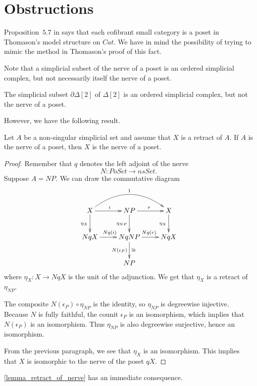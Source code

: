 
\section{Obstructions}
\label{sec:possible}

Proposition~$5.7$ in \cite{Th80} says that each cofibrant small category is a poset in Thomason's model structure on $Cat$. We have in mind the possibility of trying to mimic the method in Thomason's proof of this fact.

Note that a simplicial subset of the nerve of a poset is an ordered simplicial complex, but not necessarily itself the nerve of a poset.
\begin{example}\label{ex:supplement_lemma_retract_of_nerve}
The simplicial subset $\partial \Delta [2]$ of $\Delta [2]$ is an ordered simplicial complex, but not the nerve of a poset.
\end{example}
\noindent However, we have the following result.
\begin{lemma}\label{lemma_retract_of_nerve}
Let $A$ be a non-singular simplicial set and assume that $X$ is a retract of $A$. If $A$ is the nerve of a poset, then $X$ is the nerve of a poset.
\end{lemma}
\begin{proof}
Remember that $q$ denotes the left adjoint of the nerve
\[N:PoSet\to nsSet.\]
Suppose $A=NP$. We can draw the commutative diagram
\begin{displaymath}
\xymatrix{
X \ar@/^2pc/[rr]^1 \ar[d]_{\eta _X} \ar[r]^i & NP \ar[d]_{\eta _{NP}} \ar[r]^r & X \ar[d]_{\eta _X} \\
NqX \ar[r]^{Nq(i)} & NqNP \ar[d]_{N(\epsilon _P)}^\cong \ar[r]^{Nq(r)} & NqX \\
& NP
}
\end{displaymath}
where $\eta _X:X\to NqX$ is the unit of the adjunction. We get that $\eta _X$ is a retract of $\eta _{NP}$.

The composite $N(\epsilon _P)\circ \eta _{NP}$ is the identity, so $\eta _{NP}$ is degreewise injective. Because $N$ is fully faithful, the counit $\epsilon _P$ is an isomorphism, which implies that $N(\epsilon _P)$ is an isomorphism. Thus $\eta _{NP}$ is also degreewise surjective, hence an isomorphism.

From the previous paragraph, we see that $\eta _X$ is an isomorphism. This implies that $X$ is isomorphic to the nerve of the poset $qX$.
\end{proof}
\noindent \cref{lemma_retract_of_nerve} has an immediate consequence.

